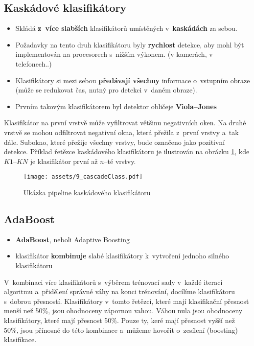 \subsection{Kaskádové klasifikátory} %
\begin{itemize}
    \item Skládá \textbf{z~více slabších} klasifikátorů umístěných v~\textbf{kaskádách} za sebou.
    \item Požadavky na tento druh klasifikátoru byly \textbf{rychlost} detekce, aby mohl být implementován na procesorech s~nižším výkonem. (v kamerách, v telefonech..)
    \item Klasifikátory si mezi sebou \textbf{předávají všechny} informace o~vstupním obraze (může se redukovat čas, nutný pro detekci v~daném obraze).
    \item Prvním takovým klasifikátorem byl detektor obličeje \textbf{Viola--Jones}
\end{itemize}
Klasifikátor na první vrstvě může vyfiltrovat většinu negativních oken. Na druhé vrstvě se mohou odfiltrovat  negativní okna, která přežila z~první vrstvy a~tak dále. Subokno, které přežije všechny vrstvy, bude označeno jako pozitivní detekce. Příklad řetězce kaskádového klasifikátoru je ilustrován na obrázku \ref{fig:ccpipeline}, kde $K1$--$KN$ je klasifikátor první až $n$--té vrstvy.

\begin{figure}[H]
    \centering
    \texttt{[image: assets/9\_cascadeClass.pdf]}
    \caption{Ukázka pipeline kaskádového klasifikátoru}
    \label{fig:ccpipeline}
\end{figure}

\subsection{AdaBoost}
\begin{itemize}
    \item \textbf{AdaBoost}, neboli Adaptive Boosting
    \item klasifikátor \textbf{kombinuje} slabé klasifikátory k~vytvoření jednoho silného klasifikátoru
\end{itemize}
V~kombinaci více klasifikátorů s~výběrem trénovací sady v~každé iteraci algoritmu a~přidělení správné váhy na konci trénování, docílíme klasifikátoru s~dobrou přesností. Klasifikátory v~tomto řetězci, které mají klasifikační přesnost menší než 50\%, jsou ohodnoceny zápornou vahou. Váhou nula jsou ohodnoceny klasifikátory, které mají přesnost 50\%. Pouze ty, keré mají přesnost vyšší než 50\%, jsou přínosné do této kombinace a~můžeme hovořit o~zesílení (boosting) klasifikace.